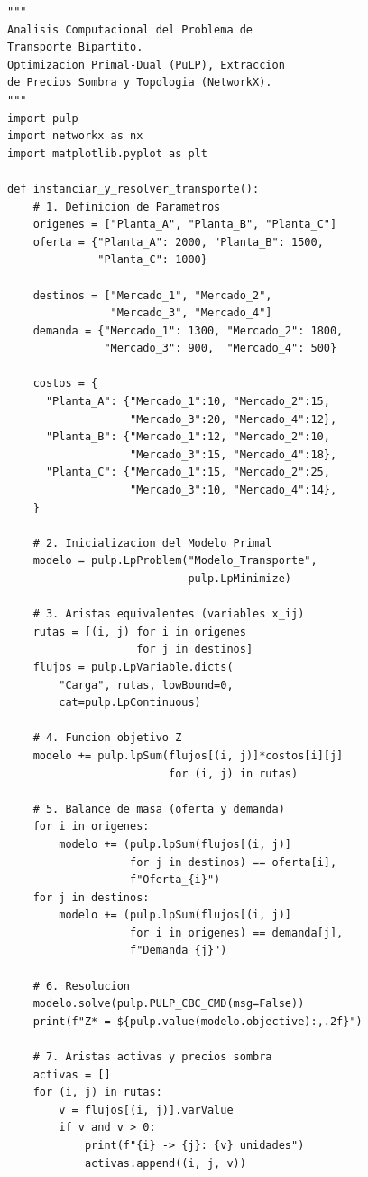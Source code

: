 \documentclass[10pt,letterpaper,twocolumn]{article}
\begin{document}
\begin{lstlisting}
"""
Analisis Computacional del Problema de
Transporte Bipartito.
Optimizacion Primal-Dual (PuLP), Extraccion
de Precios Sombra y Topologia (NetworkX).
"""
import pulp
import networkx as nx
import matplotlib.pyplot as plt

def instanciar_y_resolver_transporte():
    # 1. Definicion de Parametros
    origenes = ["Planta_A", "Planta_B", "Planta_C"]
    oferta = {"Planta_A": 2000, "Planta_B": 1500,
              "Planta_C": 1000}

    destinos = ["Mercado_1", "Mercado_2",
                "Mercado_3", "Mercado_4"]
    demanda = {"Mercado_1": 1300, "Mercado_2": 1800,
               "Mercado_3": 900,  "Mercado_4": 500}

    costos = {
      "Planta_A": {"Mercado_1":10, "Mercado_2":15,
                   "Mercado_3":20, "Mercado_4":12},
      "Planta_B": {"Mercado_1":12, "Mercado_2":10,
                   "Mercado_3":15, "Mercado_4":18},
      "Planta_C": {"Mercado_1":15, "Mercado_2":25,
                   "Mercado_3":10, "Mercado_4":14},
    }

    # 2. Inicializacion del Modelo Primal
    modelo = pulp.LpProblem("Modelo_Transporte",
                            pulp.LpMinimize)

    # 3. Aristas equivalentes (variables x_ij)
    rutas = [(i, j) for i in origenes
                    for j in destinos]
    flujos = pulp.LpVariable.dicts(
        "Carga", rutas, lowBound=0,
        cat=pulp.LpContinuous)

    # 4. Funcion objetivo Z
    modelo += pulp.lpSum(flujos[(i, j)]*costos[i][j]
                         for (i, j) in rutas)

    # 5. Balance de masa (oferta y demanda)
    for i in origenes:
        modelo += (pulp.lpSum(flujos[(i, j)]
                   for j in destinos) == oferta[i],
                   f"Oferta_{i}")
    for j in destinos:
        modelo += (pulp.lpSum(flujos[(i, j)]
                   for i in origenes) == demanda[j],
                   f"Demanda_{j}")

    # 6. Resolucion
    modelo.solve(pulp.PULP_CBC_CMD(msg=False))
    print(f"Z* = ${pulp.value(modelo.objective):,.2f}")

    # 7. Aristas activas y precios sombra
    activas = []
    for (i, j) in rutas:
        v = flujos[(i, j)].varValue
        if v and v > 0:
            print(f"{i} -> {j}: {v} unidades")
            activas.append((i, j, v))


\end{lstlisting}
\end{document}

